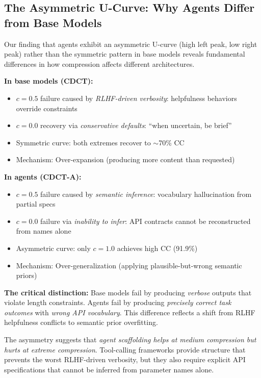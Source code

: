 \documentclass[11pt]{article}
\begin{document}
\subsection{The Asymmetric U-Curve: Why Agents Differ from Base Models}

Our finding that agents exhibit an asymmetric U-curve (high left peak, low right peak) rather than the symmetric pattern in base models reveals fundamental differences in how compression affects different architectures.

\textbf{In base models (CDCT):}
\begin{itemize}
\item $c=0.5$ failure caused by \emph{RLHF-driven verbosity}: helpfulness behaviors override constraints
\item $c=0.0$ recovery via \emph{conservative defaults}: ``when uncertain, be brief''
\item Symmetric curve: both extremes recover to $\sim$70\% CC
\item Mechanism: Over-expansion (producing more content than requested)
\end{itemize}

\textbf{In agents (CDCT-A):}
\begin{itemize}
\item $c=0.5$ failure caused by \emph{semantic inference}: vocabulary hallucination from partial specs
\item $c=0.0$ failure via \emph{inability to infer}: API contracts cannot be reconstructed from names alone
\item Asymmetric curve: only $c=1.0$ achieves high CC (91.9\%)
\item Mechanism: Over-generalization (applying plausible-but-wrong semantic priors)
\end{itemize}

\textbf{The critical distinction:} Base models fail by producing \emph{verbose} outputs that violate length constraints. Agents fail by producing \emph{precisely correct task outcomes} with \emph{wrong API vocabulary}. This difference reflects a shift from RLHF helpfulness conflicts to semantic prior overfitting.

The asymmetry suggests that \emph{agent scaffolding helps at medium compression but hurts at extreme compression}. Tool-calling frameworks provide structure that prevents the worst RLHF-driven verbosity, but they also require explicit API specifications that cannot be inferred from parameter names alone.
\end{document}
